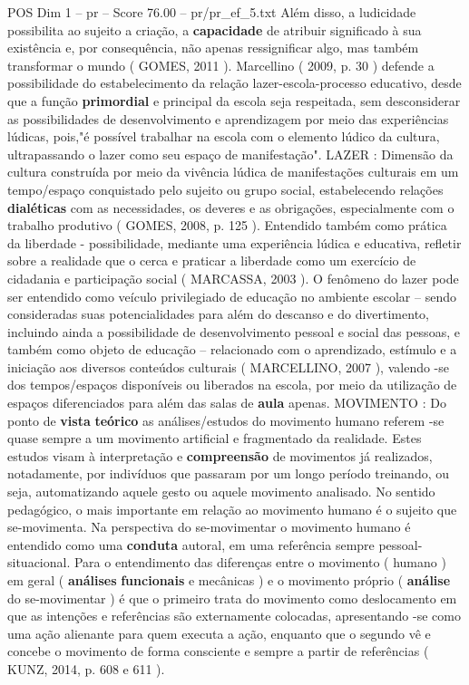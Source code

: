 \begin{textsample}{POS Dim 1 – pr – Score 76.00 – pr/pr\_ef\_5.txt}
Além disso, a ludicidade possibilita ao sujeito a criação, a \textbf{capacidade} de atribuir significado à sua existência e, por consequência, não apenas ressignificar algo, mas também transformar o mundo ( GOMES, 2011 ).
Marcellino ( 2009, p. 30 ) defende a possibilidade do estabelecimento da relação lazer-escola-processo educativo, desde que a função \textbf{primordial} e principal da escola seja respeitada, sem desconsiderar as possibilidades de desenvolvimento e aprendizagem por meio das experiências lúdicas, pois,"é possível trabalhar na escola com o elemento lúdico da cultura, ultrapassando o lazer como seu espaço de manifestação".
LAZER : Dimensão da cultura construída por meio da vivência lúdica de manifestações culturais em um tempo/espaço conquistado pelo sujeito ou grupo social, estabelecendo relações \textbf{dialéticas} com as necessidades, os deveres e as obrigações, especialmente com o trabalho produtivo ( GOMES, 2008, p. 125 ).
Entendido também como prática da liberdade - possibilidade, mediante uma experiência lúdica e educativa, refletir sobre a realidade que o cerca e praticar a liberdade como um exercício de cidadania e participação social ( MARCASSA, 2003 ).
O fenômeno do lazer pode ser entendido como veículo privilegiado de educação no ambiente escolar – sendo consideradas suas potencialidades para além do descanso e do divertimento, incluindo ainda a possibilidade de desenvolvimento pessoal e social das pessoas, e também como objeto de educação – relacionado com o aprendizado, estímulo e a iniciação aos diversos conteúdos culturais ( MARCELLINO, 2007 ), valendo -se dos tempos/espaços disponíveis ou liberados na escola, por meio da utilização de espaços diferenciados para além das salas de \textbf{aula} apenas.
MOVIMENTO : Do ponto de \textbf{vista} \textbf{teórico} as análises/estudos do movimento humano referem -se quase sempre a um movimento artificial e fragmentado da realidade.
Estes estudos visam à interpretação e \textbf{compreensão} de movimentos já realizados, notadamente, por indivíduos que passaram por um longo período treinando, ou seja, automatizando aquele gesto ou aquele movimento analisado.
No sentido pedagógico, o mais importante em relação ao movimento humano é o sujeito que se-movimenta.
Na perspectiva do se-movimentar o movimento humano é entendido como uma \textbf{conduta} autoral, em uma referência sempre pessoal-situacional.
Para o entendimento das diferenças entre o movimento ( humano ) em geral ( \textbf{análises} \textbf{funcionais} e mecânicas ) e o movimento próprio ( \textbf{análise} do se-movimentar ) é que o primeiro trata do movimento como deslocamento em que as intenções e referências são externamente colocadas, apresentando -se como uma ação alienante para quem executa a ação, enquanto que o segundo vê e concebe o movimento de forma consciente e sempre a partir de referências ( KUNZ, 2014, p. 608 e 611 ).

\end{textsample}
